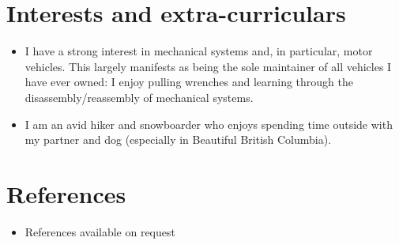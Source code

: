 \documentclass[11pt,a4paper,sans]{moderncv}        %
\begin{document}
\section{Interests and extra-curriculars}

\vspace{6pt}

\begin{itemize}



\item{I have a strong interest in mechanical systems and, in particular, motor vehicles. 
This largely manifests as being the sole maintainer of all vehicles I have ever owned:
I enjoy pulling wrenches and learning through the disassembly/reassembly of mechanical systems.}

\vspace{6pt}

\item{I am an avid hiker and snowboarder who enjoys spending time outside with my partner 
and dog (especially in Beautiful British Columbia).}

\end{itemize}

\section{References}

\vspace{6pt}
 
\begin{itemize}

\item{References available on request}

\end{itemize}

\nocite{*}

 
\end{document}
